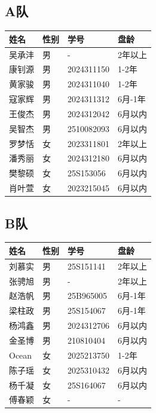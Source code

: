 \documentclass{ctexart}
\begin{document}
\subsection*{A队}
\renewcommand{\arraystretch}{1.2}
\begin{tabularx}{\textwidth}{@{} L{4.5cm} M{1.4cm} L{3cm} X @{}}
    \toprule
    \textbf{姓名} & \textbf{性别} & \textbf{学号} & \textbf{盘龄} \\
    \midrule
    吴承沣 & 男 & - & 2年以上 \\
    康钊源 & 男 & 2024311150 & 1-2年 \\
    黄家骏 & 男 & 2024311040 & 1-2年 \\
    寇家辉 & 男 & 2024311312 & 6月-1年 \\
    王俊杰 & 男 & 2024312042 & 6月以内 \\
    吴智杰 & 男 & 2510082093 & 6月以内 \\
    罗梦恬 & 女 & 2023311801 & 2年以上 \\
    潘秀丽 & 女 & 2024312180 & 6月以内 \\
    樊黎硕 & 女 & 25S153056 & 6月以内 \\
    肖叶萱 & 女 & 2023215045 & 6月以内 \\
    \bottomrule
\end{tabularx}

\subsection*{B队}
\renewcommand{\arraystretch}{1.2}
\begin{tabularx}{\textwidth}{@{} L{4.5cm} M{1.4cm} L{3cm} X @{}}
    \toprule
    \textbf{姓名} & \textbf{性别} & \textbf{学号} & \textbf{盘龄} \\
    \midrule
    刘慕实 & 男 & 25S151141 & 2年以上 \\
    张骋旭 & 男 & - & 2年以上 \\
    赵浩帆 & 男 & 25B965005 & 6月-1年 \\
    梁柱政 & 男 & 25S154067 & 6月-1年 \\
    杨鸿鑫 & 男 & 2024312706 & 6月以内 \\
    金圣博 & 男 & 210810404 & 6月以内 \\
    Ocean & 女 & 2025213750 & 1-2年 \\
    陈子瑶 & 女 & 2025310432 & 6月以内 \\
    杨千凝 & 女 & 25S164067 & 6月以内 \\
    傅春颖 & 女 & - & - \\
    \bottomrule
\end{tabularx}
\end{document}

